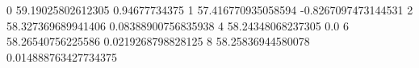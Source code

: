 0 59.19025802612305 0.94677734375
1 57.416770935058594 -0.8267097473144531
2 58.327369689941406 0.08388900756835938
4 58.24348068237305 0.0
6 58.26540756225586 0.0219268798828125
8 58.25836944580078 0.014888763427734375
